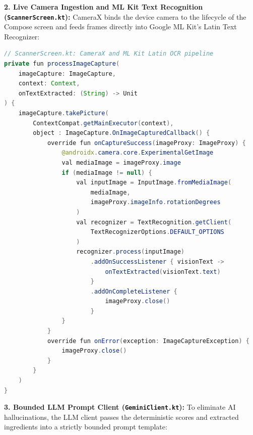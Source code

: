 \documentclass[12pt]{article}
\begin{document}
\vspace{0.5cm}

\noindent
\textbf{2. Live Camera Ingestion and ML Kit Text Recognition (\texttt{ScannerScreen.kt}):}
CameraX binds the device camera to the lifecycle of the Compose screen and feeds frames directly into Google ML Kit's Latin Text Recognizer:

\begin{lstlisting}[language=Java, caption={CameraX Lifecycle Binding and OCR Ingestion}]
// ScannerScreen.kt: CameraX and ML Kit Latin OCR pipeline
private fun processImageCapture(
    imageCapture: ImageCapture,
    context: Context,
    onTextExtracted: (String) -> Unit
) {
    imageCapture.takePicture(
        ContextCompat.getMainExecutor(context),
        object : ImageCapture.OnImageCapturedCallback() {
            override fun onCaptureSuccess(imageProxy: ImageProxy) {
                @androidx.camera.core.ExperimentalGetImage
                val mediaImage = imageProxy.image
                if (mediaImage != null) {
                    val inputImage = InputImage.fromMediaImage(
                        mediaImage,
                        imageProxy.imageInfo.rotationDegrees
                    )
                    val recognizer = TextRecognition.getClient(
                        TextRecognizerOptions.DEFAULT_OPTIONS
                    )
                    recognizer.process(inputImage)
                        .addOnSuccessListener { visionText ->
                            onTextExtracted(visionText.text)
                        }
                        .addOnCompleteListener {
                            imageProxy.close()
                        }
                }
            }
            override fun onError(exception: ImageCaptureException) {
                imageProxy.close()
            }
        }
    )
}
\end{lstlisting}

\vspace{0.5cm}

\noindent
\textbf{3. Bounded LLM Prompt Client (\texttt{GeminiClient.kt}):}
To eliminate AI hallucinations, the LLM client passes the deterministic scores and extracted ingredients into a strictly bounded prompt template:
\end{document}
